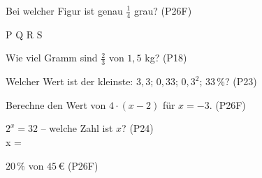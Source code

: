 \documentclass[11pt]{article}
\begin{document}
\small

\begin{aufgabe}{Bei welcher Figur ist genau $\frac{1}{4}$ grau? \hfill (P26F) \\    }

P  \quad Q  \quad R  \quad S 
\end{aufgabe}

\begin{aufgabe}{Wie viel Gramm sind $\frac{2}{3}$ von $1{,}5$ kg? \hfill (P18) \\ \leerfeld[g]}
\end{aufgabe}

\begin{aufgabe}{Welcher Wert ist der kleinste: $3{,}3$; $0{,}33$; $0{,}3^2$; $33\,\%$? \hfill (P23) \\ \leerfeld}
\end{aufgabe}

\begin{aufgabe}{Berechne den Wert von $4 \cdot (x - 2)$ für $x = -3$. \hfill (P26F) \\ \leerfeld}
\end{aufgabe}

\begin{aufgabe}{$2^x = 32$ – welche Zahl ist $x$? \hfill (P24) \\ x = \leerfeld}
\end{aufgabe}

\begin{aufgabe}{$20\,\%$ von $45\,€$ \hfill (P26F) \\ \leerfeld[€]}
\end{aufgabe}
\end{document}
